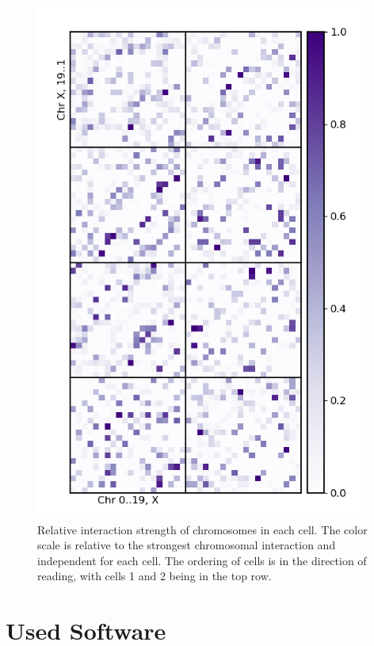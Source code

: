 \documentclass[a4paper,11pt,oneside,final,english,toc=bib]{scrbook}
\newcommand{\figwidth}{11.0cm} %
\begin{document}
\begin{figure}[ht]
\centering
  \includegraphics[width=\figwidth]{chrom_contacts.png}
  \caption{Relative interaction strength of chromosomes in each cell. The color scale is relative to the strongest chromosomal interaction and independent for each cell. The ordering of cells is in the direction of reading, with cells 1 and 2 being in the top row.}
  \label{fig:chrom_contacts}
\end{figure}


\chapter{Used Software} %
\label{cha:used_software}
\end{document}
